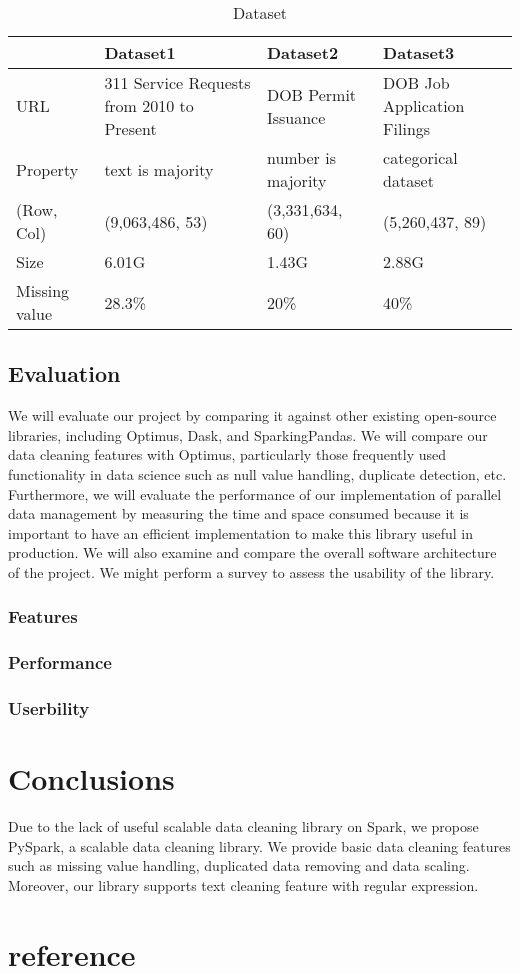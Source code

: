 \documentclass[sigconf]{acmart}
\begin{document}
\begin{table} [h]
\small
\centering
\caption{Dataset}   
\begin{tabular}{|p{1.7cm}|p{2cm}|p{2cm}|p{2cm}|} 
\hline  
& Dataset1 & Dataset2 & Dataset3\\ \hline  
URL & 311 Service Requests from 2010 to Present\cite{nycopendata1}& DOB Permit Issuance\cite{nycopendata2}&DOB Job Application Filings\cite{nycopendata3}\\  \hline
Property & text is majority&number is majority&categorical dataset\\ \hline
(Row, Col) &(9,063,486, 53)&(3,331,634, 60)&(5,260,437, 89)\\  \hline
Size&6.01G & 1.43G & 2.88G\\ \hline
Missing value&28.3\%&20\%&40\%\\
\hline  
\end{tabular}   
\end{table}
\subsection{Evaluation}
We will evaluate our project by comparing it against other existing open-source libraries, including Optimus\cite{optimus}, Dask\cite{dask}, and SparkingPandas\cite{sparklingpandas}. We will compare our data cleaning features with Optimus, particularly those frequently used functionality in data science such as null value handling, duplicate detection, etc. Furthermore, we will evaluate the performance of our implementation of parallel data management by measuring the time and space consumed because it is important to have an efficient implementation to make this library useful in production. We will also examine and compare the overall software architecture of the project. We might perform a survey to assess the usability of the library.
\subsubsection{Features}
\subsubsection{Performance}
\subsubsection{Userbility}

\section{Conclusions}
Due to the lack of useful scalable data cleaning library on Spark, we propose PySpark, a scalable data cleaning library. We provide basic data cleaning features such as missing value handling, duplicated data removing and data scaling. Moreover, our library supports text cleaning feature with regular expression.

\section{reference}


\end{document}
